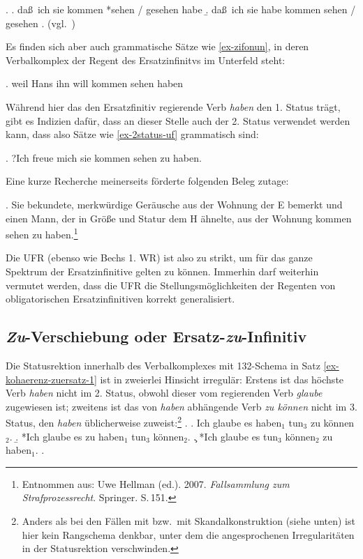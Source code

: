 \ex. \label{ex-bech-5}
\a. da\ss\ ich sie kommen *sehen / gesehen habe
\b. da\ss\ ich sie habe kommen sehen / gesehen
\z. (vgl.\ \citealt[\S 20]{Bech:63}) 

Es finden sich aber auch grammatische Sätze wie \ref{ex-zifonun}, in deren Verbalkomplex der Regent des Ersatzinfinitvs im Unterfeld steht:

\ex. \label{ex-zifonun}weil Hans ihn will kommen sehen haben \hfill 
\citep[1286]{Zifonun:etal:97}

Während hier das den Ersatzfinitiv regierende Verb {\it haben} den 1. Status trägt, gibt es Indizien dafür, dass an dieser Stelle auch der 2. Status verwendet werden kann, dass also Sätze wie \ref{ex-2status-uf} grammatisch sind:

\ex. ?Ich freue mich sie kommen sehen zu haben. \label{ex-2status-uf}

Eine kurze Recherche meinerseits förderte folgenden Beleg zutage:

\ex. Sie bekundete, merkwürdige Geräusche aus der Wohnung der E bemerkt und einen Mann, der in Grö\ss e und Statur dem H ähnelte, aus der Wohnung kommen sehen zu haben.\footnote{Entnommen aus: Uwe Hellman (ed.). 2007. \textit{Fallsammlung zum Strafprozessrecht}. Springer. S.\,151.}\label{ex-2status-uf-corpus}

Die UFR (ebenso wie Bechs 1. WR) ist also zu strikt, um für das ganze Spektrum der Ersatzinfinitive gelten zu können. Immerhin darf weiterhin vermutet werden, dass die UFR die Stellungsmöglichkeiten der Regenten von obligatorischen Ersatzinfinitiven korrekt generalisiert.


\subsection{\emph{Zu}-Verschiebung oder Ersatz-\emph{zu}-Infinitiv}

\largerpage%
\largerpage[-0.3]%
%
Die Statusrektion innerhalb des Verbalkomplexes mit 132-Schema in Satz \ref{ex-kohaerenz-zuersatz-1} ist in zweierlei Hinsicht irregulär: Erstens ist das höchste Verb {\it haben} nicht im 2. Status, obwohl dieser vom regierenden Verb {\it glaube} zugewiesen ist; zweitens ist das von {\it haben} abhängende Verb {\it zu können} nicht im 3. Status, den {\it haben} \nopagebreak üblicherweise zuweist:\footnote{Anders als bei den Fällen mit  bzw.\ mit Skandalkonstruktion (siehe unten) ist hier kein Rangschema denkbar, unter dem die angesprochenen Irregularitäten in der Statusrektion verschwinden.}
\ex. 
\a. Ich glaube es haben$_1$ tun$_3$ zu können$_2$. \label{ex-kohaerenz-zuersatz-1}
\b. *Ich glaube es zu haben$_1$ tun$_3$ können$_2$. \label{ex-kohaerenz-zuersatz-1-b}
\c. *Ich glaube es tun$_3$ können$_2$ zu haben$_1$. \label{ex-kohaerenz-zuersatz-1-c}
\z. \citep[\S 14]{Bech:63}

